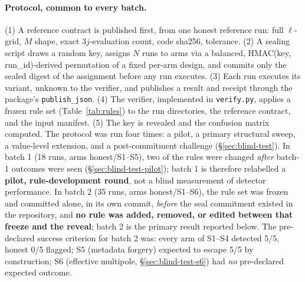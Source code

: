 \documentclass[11pt]{article}
\begin{document}
\paragraph{Protocol, common to every batch.} (1) A reference contract is published
first, from one honest reference run: full \(\ell\)-grid, \(M\) shape, exact
3\(j\)-evaluation count, code sha256, tolerance. (2) A sealing script draws a
random key, assigns \(N\) runs to arms via a balanced, HMAC(key, run\_id)-derived
permutation of a fixed per-arm design, and commits only the sealed digest of
the assignment before any run executes. (3) Each run executes its variant,
unknown to the verifier, and publishes a result and receipt through the
package's \texttt{publish\_json}. (4) The verifier, implemented in
\texttt{verify.py}, applies a frozen rule set
(Table~\ref{tab:rules}) to the run directories, the reference contract, and
the input manifest. (5) The key is revealed and the confusion matrix
computed. The protocol was run four times: a pilot, a primary structural
sweep, a value-level extension, and a post-commitment challenge
(\S\ref{sec:blind-test}). In batch 1 (18 runs, arms
honest/S1--S5), two of the rules were changed \emph{after} batch-1 outcomes
were seen (\S\ref{sec:blind-test-pilot}); batch 1 is therefore relabelled a
\textbf{pilot, rule-development round}, not a blind measurement of detector
performance. In batch 2 (35 runs, arms honest/S1--S6), the rule set was
frozen and committed alone, in its own commit, \emph{before} the seal
commitment existed in the repository, and \textbf{no rule was added,
removed, or edited between that freeze and the reveal}; batch 2 is the
primary result reported below. The pre-declared success criterion for batch 2
was: every arm of S1--S4 detected 5/5, honest 0/5 flagged; S5 (metadata
forgery) expected to escape 5/5 by construction; S6 (effective multipole,
\S\ref{sec:blind-test-s6}) had \emph{no} pre-declared expected outcome.
\end{document}

